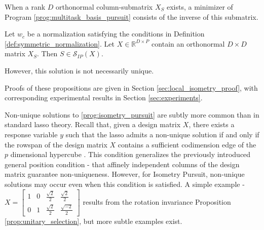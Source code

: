 When a rank $D$ orthonormal column-submatrix $X_{S}$ exists, a minimizer of Program \ref{prog:multitask_basis_pursuit} consists of the inverse of this submatrix.
\begin{proposition}
Let $w_c$ be a normalization satisfying the conditions in Definition \ref{def:symmetric_normalization}.
Let $X \in \mathbb R^{D \times P}$ contain an orthonormal $D \times D$ matrix $X_S$.
Then $S \in \mathcal S_{IP} (X)$.
\label{prop:unitary_selection}
\end{proposition}
However, this solution is not necessarily unique.
\begin{proposition}
\end{proposition}
Proofs of these propositions are given in Section \ref{sec:local_isometry_proof}, with corresponding experimental results in Section \ref{sec:experiments}.

Non-unique solutions to \ref{prog:isometry_pursuit} are subtly more common than in standard lasso theory.
Recall that, given a design matrix $X$, there exists a response variable $y$ such that the lasso admits a non-unique solution if and only if the rowspan of the design matrix $X$ contains a sufficient codimension edge of the $p$ dimensional hypercube \citep{JMLR:v23:21-0420}.
This condition generalizes the previously introduced general position condition - that affinely independent columns of the design matrix guarantee non-uniqueness.
However, for Isometry Pursuit, non-unique solutions may occur even when this condition is satisfied.
A simple example -
$X =
\begin{bmatrix}
1 & 0 & \frac{\sqrt{2}}{2} & \frac{\sqrt{2}}{2}  \\
0 & 1 & \frac{\sqrt{2}}{2} & \frac{\sqrt{-2}}{2}  
\end{bmatrix}$
results from the rotation invariance Proposition \ref{prop:unitary_selection}, but more subtle examples exist.
 

